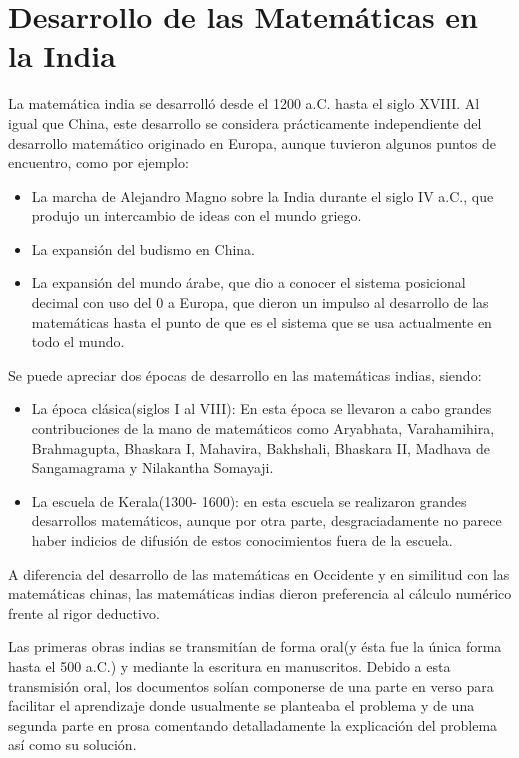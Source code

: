 \documentclass[a4paper, 11pt]{article}
\begin{document}
\section{Desarrollo de las Matemáticas en la India}
	La matemática india se desarrolló desde el 1200 a.C. hasta el siglo XVIII. Al igual que China, este desarrollo se
	considera prácticamente independiente del desarrollo matemático originado en Europa, aunque tuvieron algunos
	puntos de encuentro, como por ejemplo:
	\begin{itemize}
		\item La marcha de Alejandro Magno sobre la India durante el siglo IV a.C., que produjo un intercambio de ideas
		con el mundo griego.
		\item La expansión del budismo en China.
		\item La expansión del mundo árabe, que dio a conocer el sistema posicional decimal con uso del 0 a Europa, que
		dieron un impulso al desarrollo de las matemáticas hasta el punto de que es el sistema que se usa actualmente
		en todo el mundo.
	\end{itemize}	

	Se puede apreciar dos épocas de desarrollo en las matemáticas indias, siendo:
	\begin{itemize}
		\item La época clásica(siglos I al VIII): En esta época se llevaron a cabo grandes contribuciones de la mano de
		matemáticos como Aryabhata, Varahamihira, Brahmagupta, Bhaskara I, Mahavira, Bakhshali, Bhaskara II, Madhava de
		Sangamagrama y Nilakantha Somayaji.
		\item La escuela de Kerala(1300- 1600): en esta escuela se realizaron grandes desarrollos matemáticos, aunque
		por otra parte, desgraciadamente no parece haber indicios de difusión de estos conocimientos fuera de la escuela.
	\end{itemize}

	A diferencia del desarrollo de las matemáticas en Occidente y en similitud con las matemáticas chinas, las matemáticas
	indias dieron preferencia al cálculo numérico frente al rigor deductivo.

	Las primeras obras indias se transmitían de forma oral(y ésta fue la única forma hasta el 500 a.C.) y mediante la
	escritura en manuscritos. Debido a esta transmisión oral, los documentos solían componerse de una parte en verso
	para facilitar el aprendizaje donde usualmente se planteaba el problema y de una segunda parte en prosa comentando
	detalladamente la explicación del problema así como su solución.
	
\end{document}

